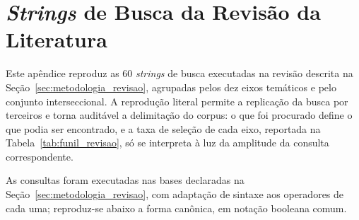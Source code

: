 \chapter{\textit{Strings} de Busca da Revisão da Literatura}
\label{apendice:strings}

Este apêndice reproduz as 60 \textit{strings} de busca executadas na revisão descrita na Seção~\ref{sec:metodologia_revisao}, agrupadas pelos dez eixos temáticos e pelo conjunto interseccional. A reprodução literal permite a replicação da busca por terceiros e torna auditável a delimitação do corpus: o que foi procurado define o que podia ser encontrado, e a taxa de seleção de cada eixo, reportada na Tabela~\ref{tab:funil_revisao}, só se interpreta à luz da amplitude da consulta correspondente.

As consultas foram executadas nas bases declaradas na Seção~\ref{sec:metodologia_revisao}, com adaptação de sintaxe aos operadores de cada uma; reproduz-se abaixo a forma canônica, em notação booleana comum.

